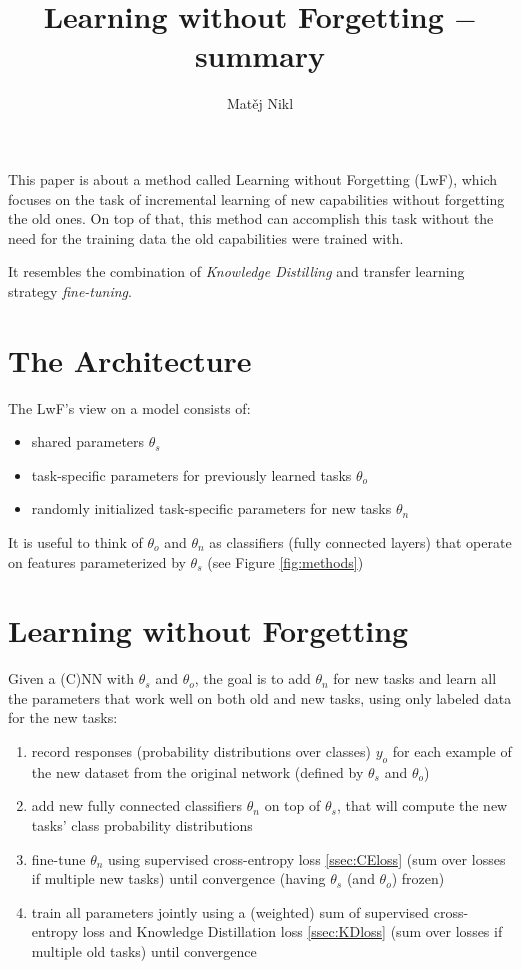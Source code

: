 \documentclass[a4paper,twocolumn]{article}
\title{Learning without Forgetting $-$ summary}
\author{Matěj Nikl}
\begin{document}
\maketitle
\noindent
This paper is about a method called Learning without Forgetting (LwF), which focuses on the task of incremental learning of new capabilities without forgetting the old ones. On top of that, this method can accomplish this task without the need for the training data the old capabilities were trained with.

It resembles the combination of \textit{Knowledge Distilling} and transfer learning strategy \textit{fine-tuning}.

\section{The Architecture}
The LwF's view on a model consists of:
\begin{itemize}
    \item shared parameters $\theta_s$
    \item task-specific parameters for previously learned tasks $\theta_o$
    \item randomly initialized task-specific parameters for new tasks $\theta_n$
\end{itemize}
It is useful to think of $\theta_o$ and $\theta_n$ as classifiers (fully connected layers) that operate on features parameterized by $\theta_s$ (see Figure \ref{fig:methods})

\section{Learning without Forgetting}
Given a (C)NN with $\theta_s$ and $\theta_o$, the goal is to add $\theta_n$ for new tasks and learn all the parameters that work well on both old and new tasks, using only labeled data for the new tasks:
\begin{enumerate}
    \item record responses (probability distributions over classes) $y_o$ for each example of the new dataset from the original network (defined by $\theta_s$ and $\theta_o$)
    \item add new fully connected classifiers $\theta_n$ on top of $\theta_s$, that will compute the new tasks' class probability distributions
    \item fine-tune $\theta_n$ using supervised cross-entropy loss \ref{ssec:CEloss} (sum over losses if multiple new tasks) until convergence (having $\theta_s$ (and $\theta_o$) frozen)
    \item train all parameters jointly using a (weighted) sum of supervised cross-entropy loss and Knowledge Distillation loss \ref{ssec:KDloss} (sum over losses if multiple old tasks) until convergence
\end{enumerate}
\end{document}
